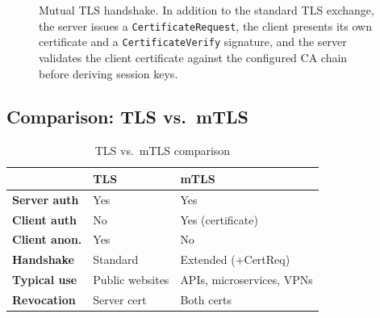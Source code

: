 \documentclass[10pt,twocolumn]{article}
\begin{document}
\begin{figure}[H]
{%
}
\caption{Mutual TLS handshake. In addition to the standard TLS exchange, the server issues a \texttt{CertificateRequest}, the client presents its own certificate and a \texttt{CertificateVerify} signature, and the server validates the client certificate against the configured CA chain before deriving session keys.}
\label{fig:mtls-handshake}
\end{figure}

\subsection{Comparison: TLS vs.\ mTLS}

\begin{table}[h]
\centering
\caption{TLS vs.\ mTLS comparison}
\label{tab:tls-mtls}
\renewcommand{\arraystretch}{1}
\begin{tabularx}{\columnwidth}{>{\bfseries\footnotesize}p{2cm}
                                >{\footnotesize}X
                                >{\footnotesize}X}
\toprule
 & \textbf{TLS} & \textbf{mTLS} \\
\midrule
Server auth   & Yes & Yes \\
Client auth   & No  & Yes (certificate) \\
Client anon.  & Yes & No \\
Handshake     & Standard & Extended (+CertReq) \\
Typical use   & Public websites & APIs, microservices, VPNs \\
Revocation    & Server cert & Both certs \\
\bottomrule
\end{tabularx}
\end{table}
\end{document}
